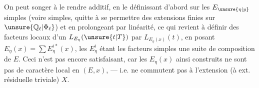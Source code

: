 On peut songer à le rendre additif, en le définissant d'abord sur les $E_{\unsure{\eta|y}}$ simples (voire  simples, quitte à se permettre des extensions finies sur $\unsure{\mathbb{Q}_{\ell}|\Phi_{\ell}}$) et en prolongeant par linéarité, ce qui revient à définir des facteurs locaux d'un $L_{E_\eta}(\unsure{t|T})$ par $L_{E_\eta(x)}(t)$, en posant $E_\eta(x)=\sum E_\eta^{i*}(x)$, les $E_\eta^i$ étant les facteurs simples  une suite de composition de $E$. Ceci n'est pas encore satisfaisant, car les $E_\eta(x)$ ainsi construits ne sont pas de caractère local en $(E,x)$, --- i.e. ne commutent pas à l'extension   (à ext. résiduelle   triviale)  $X$.
